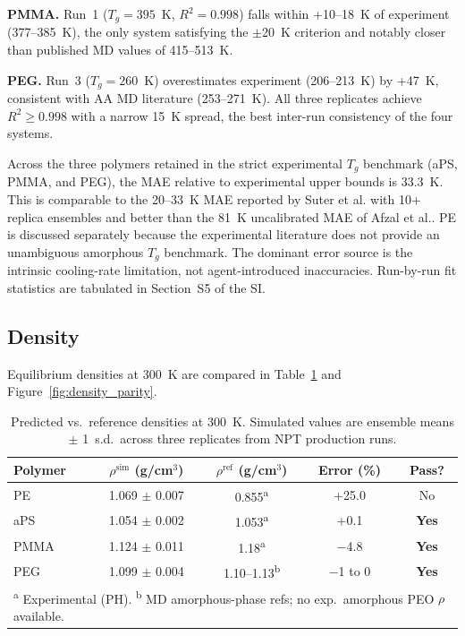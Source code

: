 \documentclass[journal=acsami,manuscript=article]{achemso}
\begin{document}
\textbf{PMMA.}
Run~1 ($T_g = 395$~K, $R^2 = 0.998$) falls within +10--18~K of experiment (377--385~K), the only system satisfying the $\pm$20~K criterion and notably closer than published MD values of 415--513~K.\cite{tang2022pmma,soldera2006tg}

\textbf{PEG.}
Run~3 ($T_g = 260$~K) overestimates experiment (206--213~K\cite{tormala1974pegtg}) by +47~K, consistent with AA MD literature (253--271~K\cite{wu2011peo}).
All three replicates achieve $R^2 \geq 0.998$ with a narrow 15~K spread, the best inter-run consistency of the four systems.

Across the three polymers retained in the strict experimental $T_g$ benchmark (aPS, PMMA, and PEG), the MAE relative to experimental upper bounds is 33.3~K. This is comparable to the 20--33~K MAE reported by Suter et al.\cite{suter2025ensemble} with 10+ replica ensembles and better than the 81~K uncalibrated MAE of Afzal et al.\cite{afzal2021highthroughput}. PE is discussed separately because the experimental literature does not provide an unambiguous amorphous $T_g$ benchmark.
The dominant error source is the intrinsic cooling-rate limitation, not agent-introduced inaccuracies. Run-by-run fit statistics are tabulated in Section~S5 of the SI.


\subsection{Density}
\label{sec:density}

Equilibrium densities at 300~K are compared in Table~\ref{tab:density_comparison} and Figure~\ref{fig:density_parity}.

\begin{table}[H]
\centering
\caption{Predicted vs.\ reference densities at 300~K.
Simulated values are ensemble means $\pm$ 1~s.d.\ across three replicates from NPT production runs.}
\label{tab:density_comparison}
\begin{tabular}{lcccc}
\toprule
\textbf{Polymer} & \textbf{$\rho^{\text{sim}}$ (g/cm$^3$)} & \textbf{$\rho^{\text{ref}}$ (g/cm$^3$)} & \textbf{Error (\%)} & \textbf{Pass?} \\
\midrule
PE   & 1.069 $\pm$ 0.007 & 0.855\textsuperscript{a} & +25.0 & No \\
aPS  & 1.054 $\pm$ 0.002 & 1.053\textsuperscript{a} & +0.1 & \textbf{Yes} \\
PMMA & 1.124 $\pm$ 0.011 & 1.18\textsuperscript{a} & $-$4.8 & \textbf{Yes} \\
PEG  & 1.099 $\pm$ 0.004 & 1.10--1.13\textsuperscript{b} & $-$1 to 0 & \textbf{Yes} \\
\bottomrule
\multicolumn{5}{l}{\footnotesize \textsuperscript{a} Experimental (PH).\cite{brandrup1999polymerhandbook} \textsuperscript{b} MD amorphous-phase refs;\cite{sponseller2021peg,wu2011peo,kacar2018peg} no exp.\ amorphous PEO $\rho$ available.} \\
\end{tabular}
\end{table}
\end{document}
